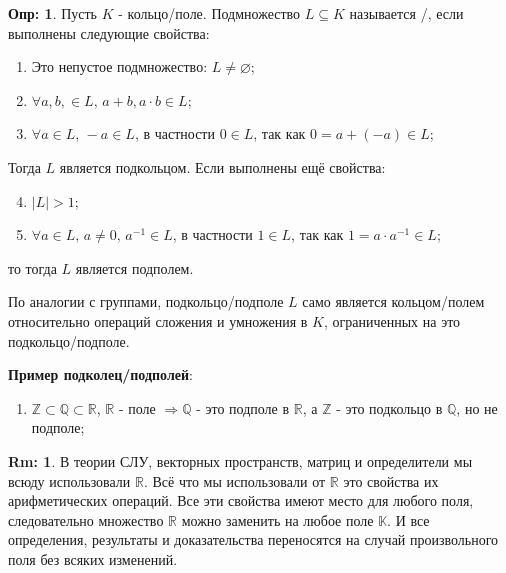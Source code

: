 \documentclass[12pt]{article}
\newcommand{\MR}{\mathbb{R}}
\newcommand{\MQ}{\mathbb{Q}}
\newcommand{\MZ}{\mathbb{Z}}
\newcommand{\VN}{\varnothing}
\theoremstyle{definition}
\newtheorem{defn}{Опр:}
\newtheorem{rem}{Rm:}
\begin{document}
\begin{defn}
	Пусть $K$ - кольцо/поле. Подмножество $L \subseteq K$ называется /, если выполнены следующие свойства:
	\begin{enumerate}[label=\arabic*)]
		\item Это непустое подмножество: $L \neq \VN$;
		\item $\forall a,b, \in L, \, a + b, a{\cdot}b \in L$;
		\item $\forall a \in L , \, -a \in L$, в частности $0 \in L$, так как $0 = a + (-a) \in L$;
	\end{enumerate}
	Тогда $L$ является подкольцом. Если выполнены ещё свойства:
	\begin{enumerate}[label=\arabic*)]
		\setcounter{enumi}{3}
		\item $|L| > 1$;
		\item $\forall a \in L, \, a \neq 0, \, a^{-1} \in L$, в частности $1 \in L$, так как $1 = a{\cdot}a^{-1} \in L$;
	\end{enumerate}
	то тогда $L$ является подполем.
\end{defn}

По аналогии с группами, подкольцо/подполе $L$ само является кольцом/полем относительно операций сложения и умножения в $K$, ограниченных на это подкольцо/подполе.

\textbf{Пример подколец/подполей}:
\begin{enumerate}[label=\arabic*)]
	\item $\MZ \subset \MQ \subset \MR$, $\MR$ - поле $\Rightarrow \MQ$ - 
	это подполе в $\MR$, а $\MZ$ - это подкольцо в $\MQ$,  но не подполе;
\end{enumerate}

\begin{rem}
	В теории СЛУ, векторных пространств, матриц и определители мы всюду использовали $\MR$. Всё что мы использовали от $\MR$ это свойства их арифметических операций. Все эти свойства имеют место для любого поля, следовательно множество $\MR$ можно заменить на любое поле $\mathbb{K}$. И все определения, результаты и доказательства переносятся на случай произвольного поля без всяких изменений.
\end{rem}
\end{document}
